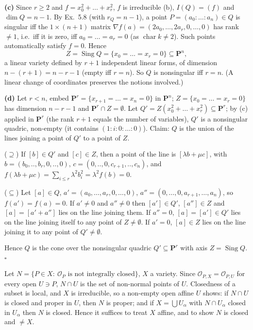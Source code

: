 \documentclass[11pt]{article}
\begin{document}
\textbf{(c)} Since $r\ge2$ and $f=x_0^2+\dots+x_r^2$, $f$ is irreducible (b), $I(Q)=(f)$ and $\dim Q=n-1$. By Ex.~5.8 (with $r_{Q}=n-1$), a point $P=(a_0:\dots:a_n)\in Q$ is singular iff the $1\times(n+1)$ matrix $\nabla f(a)=(2a_0,\dots,2a_r,0,\dots,0)$ has rank $\ne1$, i.e.\ iff it is zero, iff $a_0=\dots=a_r=0$ (as $\operatorname{char}k\ne 2$). Such points automatically satisfy $f=0$. Hence
\[
Z=\operatorname{Sing}Q=\{x_0=\dots=x_r=0\}\subseteq\mathbf P^n,
\]
a linear variety defined by $r+1$ independent linear forms, of dimension $n-(r+1)=n-r-1$ (empty iff $r=n$). So $Q$ is nonsingular iff $r=n$. (A linear change of coordinates preserves the notions involved.)

\textbf{(d)} Let $r<n$, embed $\mathbf P^r=\{x_{r+1}=\dots=x_n=0\}$ in $\mathbf P^n$; $Z=\{x_0=\dots=x_r=0\}$ has dimension $n-r-1$ and $\mathbf P^r\cap Z=\emptyset$. Let $Q'=Z(x_0^2+\dots+x_r^2)\subseteq\mathbf P^r$; by (c) applied in $\mathbf P^r$ (the rank $r+1$ equals the number of variables), $Q'$ is a nonsingular quadric, non-empty (it contains $(1:i:0:\dots:0)$). Claim: $Q$ is the union of the lines joining a point of $Q'$ to a point of $Z$.

($\supseteq$) If $[b]\in Q'$ and $[c]\in Z$, then a point of the line is $[\lambda b+\mu c]$, with $b=(b_0,..,b_r,0,..,0)$, $c=(0,..,0,c_{r+1},..,c_n)$, and $f(\lambda b+\mu c)=\sum_{i\le r}\lambda^2b_i^2=\lambda^2f(b)=0$.

($\subseteq$) Let $[a]\in Q$, $a'=(a_0,\dots,a_r,0,\dots,0)$, $a''=(0,\dots,0,a_{r+1},\dots,a_n)$, so $f(a')=f(a)=0$. If $a'\neq0$ and $a''\ne0$ then $[a']\in Q'$, $[a'']\in Z$ and $[a]=[a'+a'']$ lies on the line joining them. If $a''=0$, $[a]=[a']\in Q'$ lies on the line joining itself to any point of $Z\neq\emptyset$. If $a'=0$, $[a]\in Z$ lies on the line joining it to any point of $Q'\ne\emptyset$.

Hence $Q$ is the cone over the nonsingular quadric $Q'\subseteq\mathbf P^r$ with axis $Z=\operatorname{Sing}Q$. \hfill$\square$

\pf
Let $N=\{P\in X:\ \mathcal O_P\text{ is not integrally closed}\}$, $X$ a variety. Since $\mathcal O_{P,X}=\mathcal O_{P,U}$ for every open $U\ni P$, $N\cap U$ is the set of non-normal points of $U$. Closedness of a subset is local, and $X$ is irreducible, so a non-empty open affine $U$ shows: if $N\cap U$ is closed and proper in $U$, then $N$ is proper; and if $X=\bigcup U_\alpha$ with $N\cap U_\alpha$ closed in $U_\alpha$ then $N$ is closed. Hence it suffices to treat $X$ affine, and to show $N$ is closed and $\neq X$.
\end{document}
